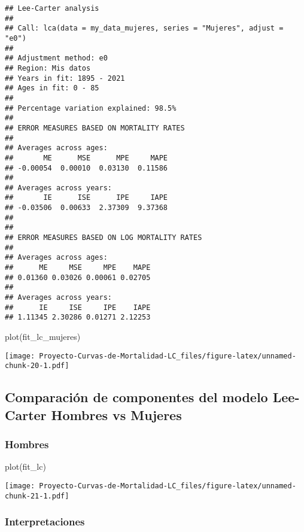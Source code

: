 \documentclass[
]{article}
\newenvironment{Shaded}{\begin{snugshade}}{\end{snugshade}}
\newcommand{\FunctionTok}[1]{\textcolor[rgb]{0.00,0.00,0.00}{#1}}
\newcommand{\NormalTok}[1]{#1}
\begin{document}
\begin{verbatim}
## Lee-Carter analysis
## 
## Call: lca(data = my_data_mujeres, series = "Mujeres", adjust = "e0") 
## 
## Adjustment method: e0
## Region: Mis datos
## Years in fit: 1895 - 2021
## Ages in fit: 0 - 85 
## 
## Percentage variation explained: 98.5%
## 
## ERROR MEASURES BASED ON MORTALITY RATES
## 
## Averages across ages:
##       ME      MSE      MPE     MAPE 
## -0.00054  0.00010  0.03130  0.11586 
## 
## Averages across years:
##       IE      ISE      IPE     IAPE 
## -0.03506  0.00633  2.37309  9.37368 
## 
## 
## ERROR MEASURES BASED ON LOG MORTALITY RATES
## 
## Averages across ages:
##      ME     MSE     MPE    MAPE 
## 0.01360 0.03026 0.00061 0.02705 
## 
## Averages across years:
##      IE     ISE     IPE    IAPE 
## 1.11345 2.30286 0.01271 2.12253
\end{verbatim}

\begin{Shaded}
\begin{Highlighting}[]
\FunctionTok{plot}\NormalTok{(fit\_lc\_mujeres)}
\end{Highlighting}
\end{Shaded}

\texttt{[image: Proyecto-Curvas-de-Mortalidad-LC\_files/figure-latex/unnamed-chunk-20-1.pdf]}

\clearpage

\hypertarget{comparaciuxf3n-de-componentes-del-modelo-lee-carter-hombres-vs-mujeres}{%
\subsection{Comparación de componentes del modelo Lee-Carter Hombres vs
Mujeres}\label{comparaciuxf3n-de-componentes-del-modelo-lee-carter-hombres-vs-mujeres}}

\hypertarget{hombres}{%
\subsubsection{Hombres}\label{hombres}}

\begin{Shaded}
\begin{Highlighting}[]
\FunctionTok{plot}\NormalTok{(fit\_lc)}
\end{Highlighting}
\end{Shaded}

\texttt{[image: Proyecto-Curvas-de-Mortalidad-LC\_files/figure-latex/unnamed-chunk-21-1.pdf]}

\hypertarget{interpretaciones}{%
\subsubsection{Interpretaciones}\label{interpretaciones}}
\end{document}
